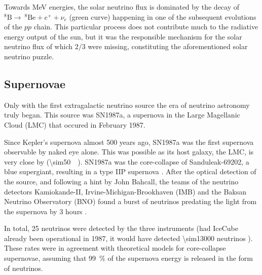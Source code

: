 \documentclass[
    a4paper, %
    fontsize=10pt, %
    twoside=false, %
    numbers=noenddot, %
    fontmethod=tex,
]{kaobook}
\begin{document}
Towards \unit{\mega\eV} energies, the solar neutrino flux is dominated by the decay of $^8\text{B}\rightarrow ~^8\text{Be} + e^+ + \nu_e$ (green curve) happening in one of the subsequent evolutions of the $pp$ chain. This particular process does not contribute much to the radiative energy output of the sun, but it was the responsible mechanism for the solar neutrino flux of which $2/3$ were missing, constituting the aforementioned solar neutrino puzzle.

\subsection{Supernovae} \label{sne}
Only with the first extragalactic neutrino source the era of neutrino astronomy truly began. This source was SN1987a, a supernova in the Large Magellanic Cloud (LMC) that occured in February 1987.

Since Kepler's supernova almost 500 years ago, SN1987a was the first supernova observable by naked eye alone. This was possible as its host galaxy, the LMC, is very close by (\SI{\sim50}{\kilo\parsec}). SN1987a was the core-collapse of Sanduleak-69202, a blue supergiant, resulting in a type IIP supernova . After the optical detection of the source, and following a hint by John Bahcall, the teams of the neutrino detectors Kamiokande-II, Irvine-Michigan-Brookhaven (IMB) and the Baksan Neutrino Observatory (BNO) found a burst of neutrinos predating the light from the supernova by 3 hours .

In total, 25 neutrinos were detected by the three instruments (had IceCube already been operational in 1987, it would have detected \num{\sim13000} neutrinos ). These rates were in agreement with theoretical models for core-collapse supernovae, assuming that \SI{99}{\percent} of the supernova energy is released in the form of neutrinos.
\end{document}
